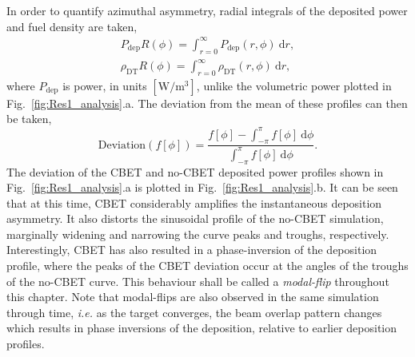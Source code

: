 In order to quantify azimuthal asymmetry, radial integrals of the deposited power and fuel density are taken,
\begin{equation}
    \label{eq:Res1_radint}
    \begin{gathered}
        P_{\text{dep}}R(\phi) = \int_{r=0}^{\infty} P_{\text{dep}}(r,\phi)\ \text{d}r, \\
        \rho_{\text{DT}}R(\phi) = \int_{r=0}^{\infty} \rho_{\text{DT}}(r,\phi)\ \text{d}r,
    \end{gathered}
\end{equation}
where $P_{\text{dep}}$ is power, in units $[\text{W}/\text{m}^{3}]$, unlike the volumetric power plotted in Fig.~\ref{fig:Res1_analysis}.a.
The deviation from the mean of these profiles can then be taken,
\begin{equation}
    \text{Deviation}\left(f[\phi]\right) = \frac{f[\phi] - \int_{-\pi}^{\pi} f[\phi]\ \text{d}\phi}{\int_{-\pi}^{\pi} f[\phi]\ \text{d}\phi}.
\end{equation}
The deviation of the \ac{CBET} and no-\ac{CBET} deposited power profiles shown in Fig.~\ref{fig:Res1_analysis}.a is plotted in Fig.~\ref{fig:Res1_analysis}.b.
It can be seen that at this time, \ac{CBET} considerably amplifies the instantaneous deposition asymmetry.
It also distorts the sinusoidal profile of the no-\ac{CBET} simulation, marginally widening and narrowing the curve peaks and troughs, respectively.
Interestingly, \ac{CBET} has also resulted in a phase-inversion of the deposition profile, where the peaks of the \ac{CBET} deviation occur at the angles of the troughs of the no-\ac{CBET} curve.
This behaviour shall be called a \textit{modal-flip} throughout this chapter.
Note that modal-flips are also observed in the same simulation through time, \textit{i.e.} as the target converges, the beam overlap pattern changes which results in phase inversions of the deposition, relative to earlier deposition profiles.

